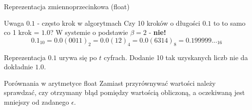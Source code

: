 \begin{frame}{Reprezentacja zmiennoprzecinkowa (float)}
    \begin{alertblock}{Uwaga}
        $0.1$ - często krok w algorytmach\newline
        Czy 10 kroków o długości $0.1$ to to samo co 1 krok = $1.0$?\newline\newline
        W systemie o podstawie $\beta = 2$ - {\bf nie!}
        \[
        0.1_{10} = 0.0(0011)_2 = 0.0(12)_4 = 0.0(6314)_8 = 0.199999..._{16}
        \]

        Reprezentacja $0.1$ urywa się po $t$ cyfrach. Dodanie 10 tak uzyskanych liczb nie da dokładnie $1.0$.
    \end{alertblock}
    
    \begin{alertblock}{Porównania w arytmetyce float}
    Zamiast przyrównywać wartości należy sprawdzać, czy otrzymany błąd pomiędzy wartością obliczoną, a oczekiwaną jest mniejszy od zadanego $\epsilon$.
    \end{alertblock}
\end{frame}
